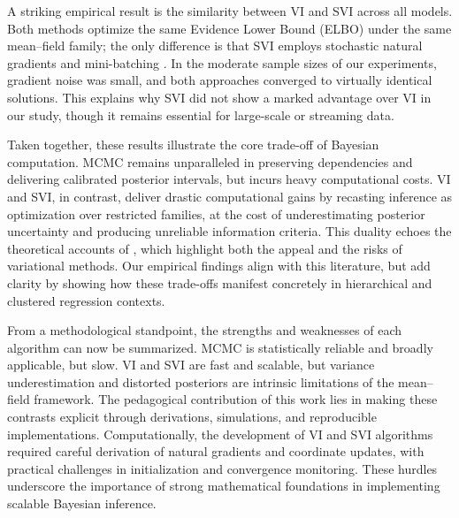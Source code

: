 \vspace{0.3cm}

A striking empirical result is the similarity between VI and SVI across all models. Both methods optimize the same Evidence Lower Bound (ELBO) under the same mean--field family; the only difference is that SVI employs stochastic natural gradients and mini-batching \cite{HOFFMAN, VAE}. In the moderate sample sizes of our experiments, gradient noise was small, and both approaches converged to virtually identical solutions. This explains why SVI did not show a marked advantage over VI in our study, though it remains essential for large-scale or streaming data.

\vspace{0.3cm}

Taken together, these results illustrate the core trade-off of Bayesian computation. MCMC remains unparalleled in preserving dependencies and delivering calibrated posterior intervals, but incurs heavy computational costs. VI and SVI, in contrast, deliver drastic computational gains by recasting inference as optimization over restricted families, at the cost of underestimating posterior uncertainty and producing unreliable information criteria. This duality echoes the theoretical accounts of \cite{Wainwright2007-ul, Blei2016VariationalIA, zhang2018advancesvariationalinference}, which highlight both the appeal and the risks of variational methods. Our empirical findings align with this literature, but add clarity by showing how these trade-offs manifest concretely in hierarchical and clustered regression contexts.

\vspace{0.3cm}

From a methodological standpoint, the strengths and weaknesses of each algorithm can now be summarized. MCMC is statistically reliable and broadly applicable, but slow. VI and SVI are fast and scalable, but variance underestimation and distorted posteriors are intrinsic limitations of the mean--field framework. The pedagogical contribution of this work lies in making these contrasts explicit through derivations, simulations, and reproducible implementations. Computationally, the development of VI and SVI algorithms required careful derivation of natural gradients and coordinate updates, with practical challenges in initialization and convergence monitoring. These hurdles underscore the importance of strong mathematical foundations in implementing scalable Bayesian inference.

\vspace{0.3cm}

